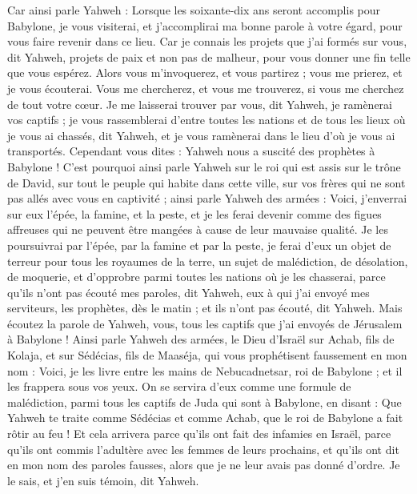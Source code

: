\begin{multicols}{2}
Car ainsi parle Yahweh : Lorsque les soixante-dix ans seront accomplis pour Babylone, je vous visiterai, et j'accomplirai ma bonne parole à votre égard, pour vous faire revenir dans ce lieu.
Car je connais les projets que j'ai formés sur vous, dit Yahweh, projets de paix et non pas de malheur, pour vous donner une fin telle que vous espérez.
Alors vous m'invoquerez, et vous partirez ; vous me prierez, et je vous écouterai.
Vous me chercherez, et vous me trouverez, si vous me cherchez de tout votre cœur.
Je me laisserai trouver par vous, dit Yahweh, je ramènerai vos captifs ; je vous rassemblerai d'entre toutes les nations et de tous les lieux où je vous ai chassés, dit Yahweh, et je vous ramènerai dans le lieu d'où je vous ai transportés.
Cependant vous dites : Yahweh nous a suscité des prophètes à Babylone !
C'est pourquoi ainsi parle Yahweh sur le roi qui est assis sur le trône de David, sur tout le peuple qui habite dans cette ville, sur vos frères qui ne sont pas allés avec vous en captivité ;
ainsi parle Yahweh des armées : Voici, j'enverrai sur eux l'épée, la famine, et la peste, et je les ferai devenir comme des figues affreuses qui ne peuvent être mangées à cause de leur mauvaise qualité.
Je les poursuivrai par l'épée, par la famine et par la peste, je ferai d'eux un objet de terreur pour tous les royaumes de la terre, un sujet de malédiction, de désolation, de moquerie, et d'opprobre parmi toutes les nations où je les chasserai,
parce qu'ils n'ont pas écouté mes paroles, dit Yahweh, eux à qui j'ai envoyé mes serviteurs, les prophètes, dès le matin ; et ils n'ont pas écouté, dit Yahweh.
Mais écoutez la parole de Yahweh, vous, tous les captifs que j'ai envoyés de Jérusalem à Babylone !
Ainsi parle Yahweh des armées, le Dieu d'Israël sur Achab, fils de Kolaja, et sur Sédécias, fils de Maaséja, qui vous prophétisent faussement en mon nom : Voici, je les livre entre les mains de Nebucadnetsar, roi de Babylone ; et il les frappera sous vos yeux.
On se servira d'eux comme une formule de malédiction, parmi tous les captifs de Juda qui sont à Babylone, en disant : Que Yahweh te traite comme Sédécias et comme Achab, que le roi de Babylone a fait rôtir au feu !
Et cela arrivera parce qu'ils ont fait des infamies en Israël, parce qu'ils ont commis l'adultère avec les femmes de leurs prochains, et qu'ils ont dit en mon nom des paroles fausses, alors que je ne leur avais pas donné d'ordre. Je le sais, et j'en suis témoin, dit Yahweh.

\end{multicols}
